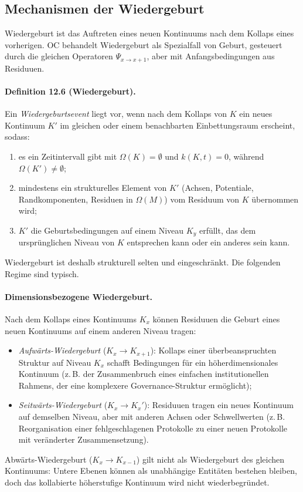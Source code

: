 \subsection{Mechanismen der Wiedergeburt}

Wiedergeburt ist das Auftreten eines neuen Kontinuums nach dem Kollaps eines
vorherigen. OC behandelt Wiedergeburt als Spezialfall von Geburt, gesteuert durch
die gleichen Operatoren \(\Psi_{x\to x+1}\), aber mit Anfangsbedingungen aus
Residuuen.

\paragraph{Definition 12.6 (Wiedergeburt).}
Ein \emph{Wiedergeburtsevent} liegt vor, wenn nach dem Kollaps von \(K\) ein
neues Kontinuum \(K'\) im gleichen oder einem benachbarten
Einbettungsraum erscheint, sodass:
\begin{enumerate}
  \item es ein Zeitintervall gibt mit
        \(\Omega(K)=\emptyset\) und \(k(K,t)=0\), während
        \(\Omega(K')\neq\emptyset\);
  \item mindestens ein strukturelles Element von \(K'\) (Achsen, Potentiale,
        Randkomponenten, Residuen in \(\Omega(M)\)) vom Residuum von \(K\)
        übernommen wird;
  \item \(K'\) die Geburtsbedingungen auf einem Niveau \(K_y\) erfüllt, das
        dem ursprünglichen Niveau von \(K\) entsprechen kann oder ein anderes
        sein kann.
\end{enumerate}

Wiedergeburt ist deshalb strukturell selten und eingeschränkt. Die folgenden
Regime sind typisch.

\paragraph{Dimensionsbezogene Wiedergeburt.}
Nach dem Kollaps eines Kontinuums \(K_x\) können Residuuen die Geburt eines neuen
Kontinuums auf einem anderen Niveau tragen:
\begin{itemize}
  \item \emph{Aufwärts-Wiedergeburt} (\(K_x\to K_{x+1}\)):
        Kollaps einer überbeanspruchten Struktur auf Niveau \(K_x\) schafft
        Bedingungen für ein höherdimensionales Kontinuum (z.\,B. der
        Zusammenbruch eines einfachen institutionellen Rahmens, der eine
        komplexere Governance-Struktur ermöglicht);
  \item \emph{Seitwärts-Wiedergeburt} (\(K_x\to K_x'\)):
        Residuuen tragen ein neues Kontinuum auf demselben Niveau, aber mit
        anderen Achsen oder Schwellwerten (z.\,B. Reorganisation einer
        fehlgeschlagenen Protokolle zu einer neuen Protokolle mit
        veränderter Zusammensetzung).
\end{itemize}
Abwärts-Wiedergeburt (\(K_x\to K_{x-1}\)) gilt nicht als Wiedergeburt des
gleichen Kontinuums: Untere Ebenen können als unabhängige Entitäten bestehen
bleiben, doch das kollabierte höherstufige Kontinuum wird nicht
wiederbegründet.

